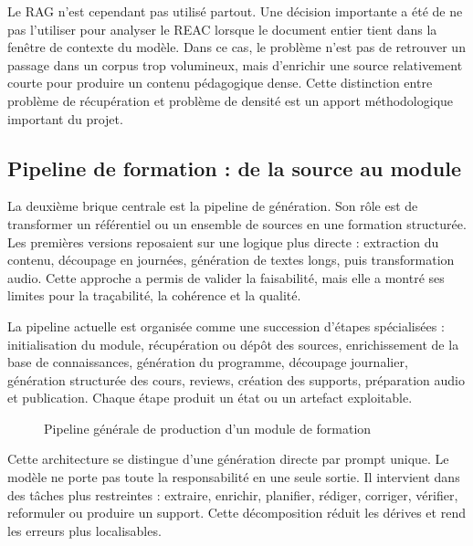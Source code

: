 Le RAG n'est cependant pas utilisé partout. Une décision importante a été de ne pas
l'utiliser pour analyser le REAC lorsque le document entier tient dans la fenêtre de
contexte du modèle. Dans ce cas, le problème n'est pas de retrouver un passage dans un
corpus trop volumineux, mais d'enrichir une source relativement courte pour produire un
contenu pédagogique dense. Cette distinction entre problème de récupération et problème
de densité est un apport méthodologique important du projet.

\subsection{Pipeline de formation : de la source au module}

La deuxième brique centrale est la pipeline de génération. Son rôle est de transformer un
référentiel ou un ensemble de sources en une formation structurée. Les premières versions
reposaient sur une logique plus directe : extraction du contenu, découpage en journées,
génération de textes longs, puis transformation audio. Cette approche a permis de valider
la faisabilité, mais elle a montré ses limites pour la traçabilité, la cohérence et la qualité.

La pipeline actuelle est organisée comme une succession d'étapes spécialisées :
initialisation du module, récupération ou dépôt des sources, enrichissement de la base de
connaissances, génération du programme, découpage journalier, génération structurée des
cours, reviews, création des supports, préparation audio et publication. Chaque étape
produit un état ou un artefact exploitable.

\begin{figure}[h]
\centering
{}
\caption{Pipeline générale de production d'un module de formation}
\end{figure}

Cette architecture se distingue d'une génération directe par prompt unique. Le modèle ne
porte pas toute la responsabilité en une seule sortie. Il intervient dans des tâches plus
restreintes : extraire, enrichir, planifier, rédiger, corriger, vérifier, reformuler ou produire
un support. Cette décomposition réduit les dérives et rend les erreurs plus localisables.

